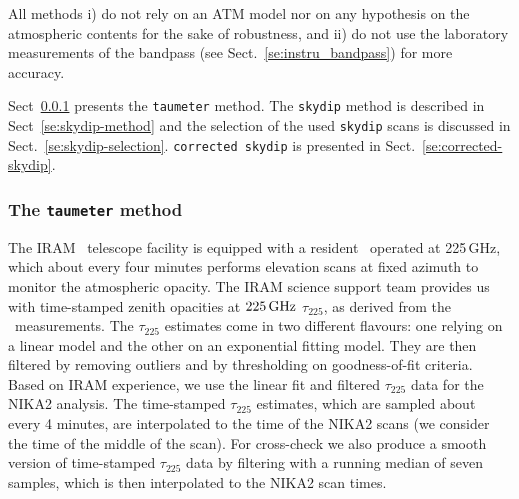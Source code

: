 All methods i) do not rely on an ATM model nor on any
hypothesis on the atmospheric contents for the sake of robustness, and
ii) do not use the laboratory measurements of the bandpass (see 
Sect.~\ref{se:instru_bandpass}) for more accuracy.  

Sect~\ref{se:taumeter-method} presents the {\tt taumeter} method. The 
{\tt skydip} method is described in Sect~\ref{se:skydip-method} and
the selection of the used {\tt skydip} scans is discussed in
Sect.~\ref{se:skydip-selection}.
{\tt corrected skydip} is presented in Sect.~\ref{se:corrected-skydip}.

\subsubsection{The {\tt taumeter} method}
\label{se:taumeter-method}

The IRAM \trentemetre\ telescope facility is equipped with a
resident \taumeter\ operated at 225\,GHz, which {\lp about every four minutes} performs elevation scans at fixed azimuth
to monitor the atmospheric opacity.
The IRAM science support
team provides us with time-stamped zenith opacities at $225\,\rm{GHz}$
$\tau_{225}$, as derived from the \taumeter\ measurements. The
$\tau_{225}$ estimates come in two different flavours: one relying
on a linear model and the other on an exponential fitting model. They
are then filtered by removing outliers and by thresholding on
goodness-of-fit criteria.
Based on IRAM experience, we use the linear fit and filtered $\tau_{225}$
data for the NIKA2 analysis. The time-stamped $\tau_{225}$ estimates,
which are sampled about every 4 minutes, are interpolated to the time
of the NIKA2 scans (we consider the time of the middle of the
scan). For cross-check we also produce a smooth version of time-stamped
$\tau_{225}$ data by
filtering with a running median of seven samples, which is then
interpolated to the NIKA2 scan times.

